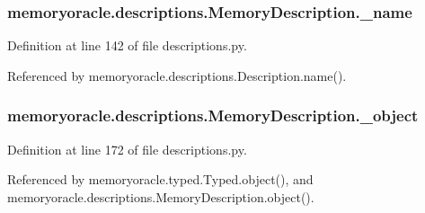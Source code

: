 \hypertarget{classmemoryoracle_1_1descriptions_1_1MemoryDescription_a230aae12304394f735d52002227c7705}{}
\subsubsection[{\+\_\+name}]{\setlength{\rightskip}{0pt plus 5cm}memoryoracle.\+descriptions.\+Memory\+Description.\+\_\+name\hspace{0.3cm}{\ttfamily [private]}}\label{classmemoryoracle_1_1descriptions_1_1MemoryDescription_a230aae12304394f735d52002227c7705}


Definition at line 142 of file descriptions.\+py.



Referenced by memoryoracle.\+descriptions.\+Description.\+name().

\hypertarget{classmemoryoracle_1_1descriptions_1_1MemoryDescription_a7c1195476ceb85c2e72765ed30f44eca}{}
\subsubsection[{\+\_\+object}]{\setlength{\rightskip}{0pt plus 5cm}memoryoracle.\+descriptions.\+Memory\+Description.\+\_\+object\hspace{0.3cm}{\ttfamily [private]}}\label{classmemoryoracle_1_1descriptions_1_1MemoryDescription_a7c1195476ceb85c2e72765ed30f44eca}


Definition at line 172 of file descriptions.\+py.



Referenced by memoryoracle.\+typed.\+Typed.\+object(), and memoryoracle.\+descriptions.\+Memory\+Description.\+object().

\hypertarget{classmemoryoracle_1_1descriptions_1_1MemoryDescription_a1ac34a11871a96eeff4f8285e0ad3a66}{}
